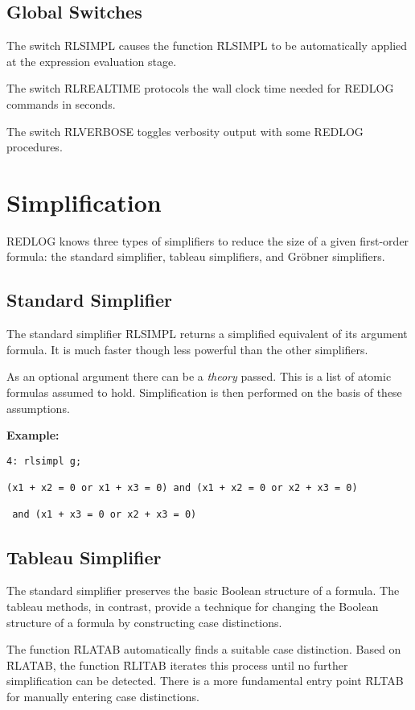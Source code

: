 \subsection{Global Switches}
The switch \f{RLSIMPL} causes the function
\f{RLSIMPL} to be automatically applied at the expression evaluation stage.

The switch \f{RLREALTIME} protocols the wall clock
time needed for {\sc REDLOG} commands in seconds.

The switch \f{RLVERBOSE} toggles verbosity output
with some {\sc REDLOG} procedures.

\section{Simplification}
{\sc REDLOG} knows three types of simplifiers to reduce the size of a
given first-order formula: the standard simplifier, tableau
simplifiers, and Gr\"obner simplifiers.

\subsection{Standard Simplifier}
The standard simplifier \f{RLSIMPL} returns a
simplified equivalent of its argument formula. It is much faster
though less powerful than the other simplifiers.

As an optional argument there can be a \emph{theory} passed. This is a
list of atomic formulas assumed to hold. Simplification is then
performed on the basis of these assumptions.

\vspace{0.5cm}
{\bf Example:}
\begin{verbatim}
4: rlsimpl g;

(x1 + x2 = 0 or x1 + x3 = 0) and (x1 + x2 = 0 or x2 + x3 = 0)

 and (x1 + x3 = 0 or x2 + x3 = 0)
\end{verbatim}

\subsection{Tableau Simplifier}
The standard simplifier preserves the basic Boolean structure of a formula. The
tableau methods, in contrast, provide a technique for changing the Boolean 
structure of a formula by constructing case distinctions.

The function \f{RLATAB} automatically finds a suitable
case distinction. Based on \f{RLATAB}, the function
\f{RLITAB} iterates this process until no further
simplification can be detected. There is a more fundamental entry
point \f{RLTAB} for manually entering case
distinctions.

